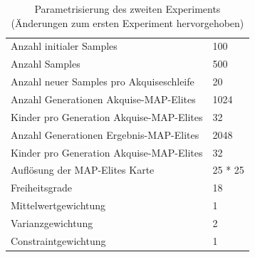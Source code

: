 \begin{table}[h]
	\centering
	\begin{tabularx}{.75\textwidth}{ll}\hline
		Anzahl initialer Samples & 100 \\
		Anzahl Samples & 500 \\
		Anzahl neuer Samples pro Akquiseschleife & 20 \\
		Anzahl Generationen Akquise-MAP-Elites & 1024 \\
		Kinder pro Generation Akquise-MAP-Elites & 32 \\
		Anzahl Generationen Ergebnis-MAP-Elites & 2048 \\
		Kinder pro Generation Akquise-MAP-Elites & 32 \\
		Auflösung der MAP-Elites Karte & 25 * 25  \\
		\hline
		Freiheitsgrade & 18 \\
		Mittelwertgewichtung & 1 \\
		Varianzgewichtung & 2 \\
		Constraintgewichtung & 1 \\
	\end{tabularx}
	\label{tab:param2nd}
	\caption{Parametrisierung des zweiten Experiments (Änderungen zum ersten Experiment hervorgehoben)}
\end{table}


